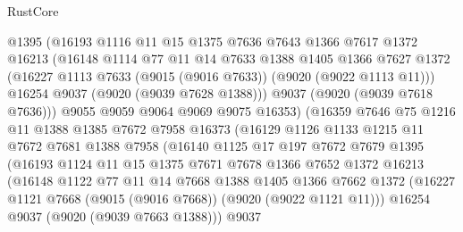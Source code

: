 \begin{lexlean}{RustCore}
\begin{coremodule}
                  @1395
                  (@16193
                    @1116
                    @11
                    @15
                    @1375
                    @7636
                    @7643
                    @1366
                    @7617
                    @1372
                    @16213
                    (@16148
                      @1114
                      @77
                      @11
                      @14
                      @7633
                      @1388
                      @1405
                      @1366
                      @7627
                      @1372
                      (@16227 @1113 @7633 (@9015 (@9016 @7633)) (@9020 (@9022 @1113 @11)))
                      @16254
                      @9037
                      (@9020 (@9039 @7628 @1388)))
                    @9037
                    (@9020 (@9039 @7618 @7636)))
                  @9055
                  @9059
                  @9064
                  @9069
                  @9075
                  @16353)
                (@16359
                  @7646
                  @75
                  @1216
                  @11
                  @1388
                  @1385
                  @7672
                  @7958
                  @16373
                  (@16129
                    @1126
                    @1133
                    @1215
                    @11
                    @7672
                    @7681
                    @1388
                    @7958
                    (@16140
                      @1125
                      @17
                      @197
                      @7672
                      @7679
                      @1395
                      (@16193
                        @1124
                        @11
                        @15
                        @1375
                        @7671
                        @7678
                        @1366
                        @7652
                        @1372
                        @16213
                        (@16148
                          @1122
                          @77
                          @11
                          @14
                          @7668
                          @1388
                          @1405
                          @1366
                          @7662
                          @1372
                          (@16227 @1121 @7668 (@9015 (@9016 @7668)) (@9020 (@9022 @1121 @11)))
                          @16254
                          @9037
                          (@9020 (@9039 @7663 @1388)))
                        @9037

\end{coremodule}
\end{lexlean}
